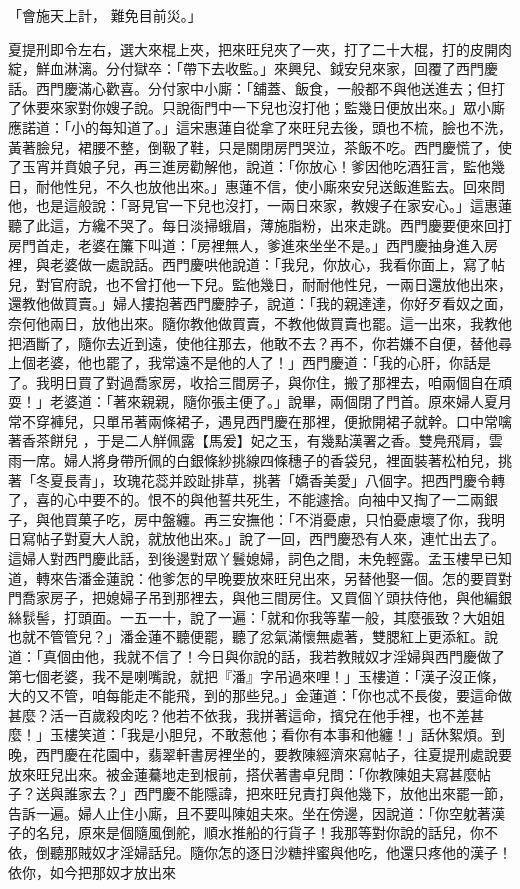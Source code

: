 「會施天上計，  難免目前災。」

夏提刑即令左右，選大來棍上夾，把來旺兒夾了一夾，打了二十大棍，打的皮開肉綻，鮮血淋漓。分付獄卒：「帶下去收監。」來興兒、鉞安兒來家，回覆了西門慶話。西門慶滿心歡喜。分付家中小廝：「舖蓋、飯食，一般都不與他送進去；但打了休要來家對你嫂子說。只說衙門中一下兒也沒打他；監幾日便放出來。」眾小廝應諾道：「小的每知道了。」這宋惠蓮自從拿了來旺兒去後，頭也不梳，臉也不洗，黃著臉兒，裙腰不整，倒靸了鞋，只是關閉房門哭泣，茶飯不吃。西門慶慌了，使了玉宵并賁娘子兒，再三進房勸解他，說道：「你放心！爹因他吃酒狂言，監他幾日，耐他性兒，不久也放他出來。」惠蓮不信，使小廝來安兒送飯進監去。回來問他，也是這般說：「哥見官一下兒也沒打，一兩日來家，教嫂子在家安心。」這惠蓮聽了此這，方纔不哭了。每日淡掃蛾眉，薄施脂粉，出來走跳。西門慶要便來回打房門首走，老婆在簾下叫道：「房裡無人，爹進來坐坐不是。」西門慶抽身進入房裡，與老婆做一處說話。西門慶哄他說道：「我兒，你放心，我看你面上，寫了帖兒，對官府說，也不曾打他一下兒。監他幾日，耐耐他性兒，一兩日還放他出來，還教他做買賣。」婦人摟抱著西門慶脖子，說道：「我的親達達，你好歹看奴之面，奈何他兩日，放他出來。隨你教他做買賣，不教他做買賣也罷。這一出來，我教他把酒斷了，隨你去近到遠，使他往那去，他敢不去？再不，你若嫌不自便，替他尋上個老婆，他也罷了，我常遠不是他的人了！」西門慶道：「我的心肝，你話是了。我明日買了對過喬家房，收拾三間房子，與你住，搬了那裡去，咱兩個自在頑耍！」老婆道：「著來親親，隨你張主便了。」說畢，兩個閉了門首。原來婦人夏月常不穿褲兒，只單吊著兩條裙子，遇見西門慶在那裡，便掀開裙子就幹。口中常噙著香茶餅兒 ，于是二人觧佩露【馬爰】妃之玉，有幾點漢署之香。雙鳧飛肩，雲雨一席。婦人將身帶所佩的白銀條紗挑線四條穗子的香袋兒，裡面裝著松柏兒，挑著「冬夏長青」，玫瑰花蕊并跤趾排草，挑著「嬌香美愛」八個字。把西門慶令轉了，喜的心中要不的。恨不的與他誓共死生，不能遽捨。向袖中又掏了一二兩銀子，與他買菓子吃，房中盤纏。再三安撫他：「不消憂慮，只怕憂慮壞了你，我明日寫帖子對夏大人說，就放他出來。」說了一回，西門慶恐有人來，連忙出去了。這婦人對西門慶此話，到後邊對眾丫鬟媳婦，詞色之間，未免輕露。孟玉樓早已知道，轉來告潘金蓮說：他爹怎的早晚要放來旺兒出來，另替他娶一個。怎的要買對門喬家房子，把媳婦子吊到那裡去，與他三間房住。又買個丫頭扶侍他，與他編銀絲䯼髻，打頭面。一五一十，說了一遍：「就和你我等輩一般，其麼張致？大姐姐也就不管管兒？」潘金蓮不聽便罷，聽了忿氣滿懷無處著，雙腮紅上更添紅。說道：「真個由他，我就不信了！今日與你說的話，我若教賊奴才淫婦與西門慶做了第七個老婆，我不是喇嘴說，就把『潘』字吊過來哩！」玉樓道：「漢子沒正條，大的又不管，咱每能走不能飛，到的那些兒。」金蓮道：「你也忒不長俊，要這命做甚麼？活一百歲殺肉吃？他若不依我，我拼著這命，擯兌在他手裡，也不差甚麼！」玉樓笑道：「我是小胆兒，不敢惹他；看你有本事和他纏！」話休絮煩。到晚，西門慶在花園中，翡翠軒書房裡坐的，要教陳經濟來寫帖子，往夏提刑處說要放來旺兒出來。被金蓮驀地走到根前，搭伏著書卓兒問：「你教陳姐夫寫甚麼帖子？送與誰家去？」西門慶不能隱諱，把來旺兒責打與他幾下，放他出來罷一節，告訴一遍。婦人止住小廝，且不要叫陳姐夫來。坐在傍邊，因說道：「你空躭著漢子的名兒，原來是個隨風倒舵，順水推船的行貨子！我那等對你說的話兒，你不依，倒聽那賊奴才淫婦話兒。隨你怎的逐日沙糖拌蜜與他吃，他還只疼他的漢子！依你，如今把那奴才放出來